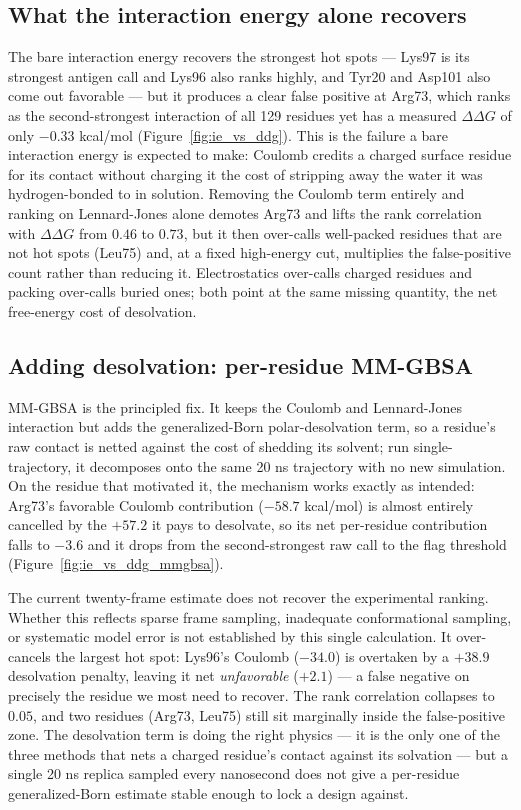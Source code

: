 \subsection{What the interaction energy alone recovers}
The bare interaction energy recovers the strongest hot spots --- Lys97 is its strongest
antigen call and Lys96 also ranks highly, and Tyr20 and Asp101 also come out favorable --- but it produces a clear false
positive at Arg73, which ranks as the second-strongest interaction of all 129 residues yet has a
measured $\Delta\Delta G$ of only $-0.33$ kcal/mol (Figure~\ref{fig:ie_vs_ddg}). This is the failure a
bare interaction energy is expected to make: Coulomb credits a charged surface residue for its
contact without charging it the cost of stripping away the water it was hydrogen-bonded to in
solution. Removing the Coulomb term entirely and ranking on Lennard-Jones alone demotes Arg73 and
lifts the rank correlation with $\Delta\Delta G$ from $0.46$ to $0.73$, but it then over-calls
well-packed residues that are not hot spots (Leu75) and, at a fixed high-energy cut, multiplies the
false-positive count rather than reducing it. Electrostatics over-calls charged residues and packing
over-calls buried ones; both point at the same missing quantity, the net free-energy cost of
desolvation.

\subsection{Adding desolvation: per-residue MM-GBSA}
MM-GBSA is the principled fix. It keeps the Coulomb and Lennard-Jones interaction but adds the
generalized-Born polar-desolvation term, so a residue's raw contact is netted against the cost of
shedding its solvent; run single-trajectory, it decomposes onto the same 20 ns trajectory with no new
simulation. On the residue that motivated it, the mechanism works exactly as intended: Arg73's
favorable Coulomb contribution ($-58.7$ kcal/mol) is almost entirely cancelled by the $+57.2$ it pays
to desolvate, so its net per-residue contribution falls to $-3.6$ and it drops from the second-strongest
raw call to the flag threshold (Figure~\ref{fig:ie_vs_ddg_mmgbsa}).

The current twenty-frame estimate does not recover the experimental ranking. Whether this
reflects sparse frame sampling, inadequate conformational sampling, or systematic model error
is not established by this single calculation. It over-cancels the largest hot spot: Lys96's Coulomb ($-34.0$) is
overtaken by a $+38.9$ desolvation penalty, leaving it net \emph{unfavorable} ($+2.1$) --- a false
negative on precisely the residue we most need to recover. The rank correlation collapses to $0.05$,
and two residues (Arg73, Leu75) still sit marginally inside the false-positive zone. The desolvation
term is doing the right physics --- it is the only one of the three methods that nets a charged
residue's contact against its solvation --- but a single 20 ns replica sampled every nanosecond does
not give a per-residue generalized-Born estimate stable enough to lock a design against.

